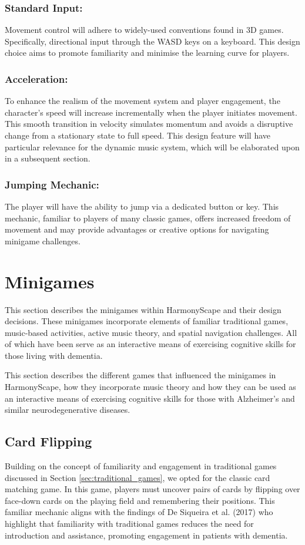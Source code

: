 \documentclass{l4proj}
\begin{document}
\subsubsection{Standard Input:} Movement control will adhere to widely-used conventions found in 3D games. Specifically, directional input through the WASD keys on a keyboard. This design choice aims to promote familiarity and minimise the learning curve for players.

\subsubsection{Acceleration:} To enhance the realism of the movement system and player engagement, the character's speed will increase incrementally when the player initiates movement. This smooth transition in velocity simulates momentum and avoids a disruptive change from a stationary state to full speed. This design feature will have particular relevance for the dynamic music system, which will be elaborated upon in a subsequent section.

\subsubsection{Jumping Mechanic:} The player will have the ability to jump via a dedicated button or key. This mechanic, familiar to players of many classic games, offers increased freedom of movement and may provide advantages or creative options for navigating minigame challenges.

\section{Minigames}
This section describes the minigames within HarmonyScape and their design decisions. These minigames incorporate elements of familiar traditional games,  music-based activities, active music theory, and spatial navigation challenges. All of which have been serve as an interactive means of exercising cognitive skills for those living with dementia.

This section describes the different games that influenced the minigames in HarmonyScape, how they incorporate music theory and how they can be used as an interactive means of exercising cognitive skills for those with Alzheimer's and similar neurodegenerative diseases.

\subsection{Card Flipping}
Building on the concept of familiarity and engagement in traditional games discussed in Section \ref{sec:traditional_games}, we opted for the classic card matching game. In this game, players must uncover pairs of cards by flipping over face-down cards on the playing field and remembering their positions. This familiar mechanic aligns with the findings of De Siqueira et al. (2017) who highlight that familiarity with traditional games reduces the need for introduction and assistance, promoting engagement in patients with dementia.
\end{document}

